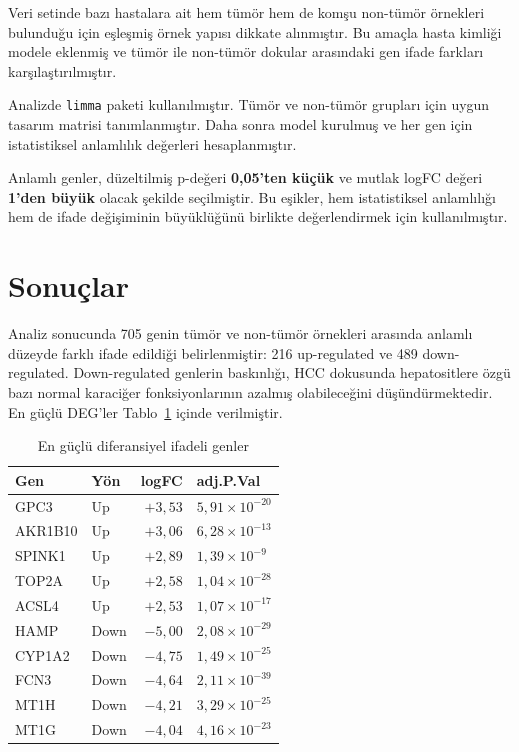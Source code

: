 \documentclass[12pt,a4paper,oneside]{report}
\begin{document}
Veri setinde bazı hastalara ait hem tümör hem de komşu non-tümör örnekleri bulunduğu için eşleşmiş örnek yapısı dikkate alınmıştır. Bu amaçla hasta kimliği modele eklenmiş ve tümör ile non-tümör dokular arasındaki gen ifade farkları karşılaştırılmıştır.

Analizde \texttt{limma} paketi kullanılmıştır. Tümör ve non-tümör grupları için uygun tasarım matrisi tanımlanmıştır. Daha sonra model kurulmuş ve her gen için istatistiksel anlamlılık değerleri hesaplanmıştır.


Anlamlı genler, düzeltilmiş p-değeri \textbf{0,05'ten küçük} ve mutlak logFC değeri \textbf{1'den büyük} olacak şekilde seçilmiştir. Bu eşikler, hem istatistiksel anlamlılığı hem de ifade değişiminin büyüklüğünü birlikte değerlendirmek için kullanılmıştır.

\section{Sonuçlar}

Analiz sonucunda 705 genin tümör ve non-tümör örnekleri arasında anlamlı düzeyde farklı ifade edildiği belirlenmiştir: 216 up-regulated ve 489 down-regulated. Down-regulated genlerin baskınlığı, HCC dokusunda hepatositlere özgü bazı normal karaciğer fonksiyonlarının azalmış olabileceğini düşündürmektedir. En güçlü DEG'ler Tablo~\ref{tab:deg} içinde verilmiştir.

\begin{table}[H]
\centering
\caption{En güçlü diferansiyel ifadeli genler}
\label{tab:deg}
\begin{tabular}{llrl}
\toprule
\textbf{Gen} & \textbf{Yön} & \textbf{logFC} & \textbf{adj.P.Val} \\
\midrule
GPC3     & Up   & $+3{,}53$ & $5{,}91\times10^{-20}$ \\
AKR1B10  & Up   & $+3{,}06$ & $6{,}28\times10^{-13}$ \\
SPINK1   & Up   & $+2{,}89$ & $1{,}39\times10^{-9}$ \\
TOP2A    & Up   & $+2{,}58$ & $1{,}04\times10^{-28}$ \\
ACSL4    & Up   & $+2{,}53$ & $1{,}07\times10^{-17}$ \\
\midrule
HAMP     & Down & $-5{,}00$ & $2{,}08\times10^{-29}$ \\
CYP1A2   & Down & $-4{,}75$ & $1{,}49\times10^{-25}$ \\
FCN3     & Down & $-4{,}64$ & $2{,}11\times10^{-39}$ \\
MT1H     & Down & $-4{,}21$ & $3{,}29\times10^{-25}$ \\
MT1G     & Down & $-4{,}04$ & $4{,}16\times10^{-23}$ \\
\bottomrule
\end{tabular}
\end{table}
\end{document}
